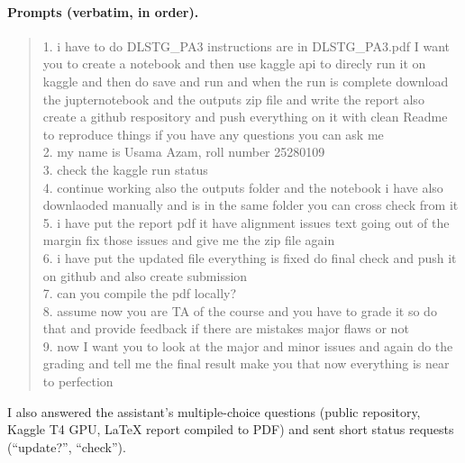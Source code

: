 \documentclass[11pt,a4paper]{article}
\begin{document}
\paragraph{Prompts (verbatim, in order).}
\begin{quote}\small\ttfamily\raggedright
1. i have to do DLSTG\_PA3 instructions are in DLSTG\_PA3.pdf I want you to create a notebook and then use kaggle api to direcly
run it on kaggle and then do save and run and when the run is complete download the jupternotebook and the outputs zip file and
write the report also create a github respository and push everything on it with clean Readme to reproduce things if you have
any questions you can ask me\\[2pt]
2. my name is Usama Azam, roll number 25280109\\[2pt]
3. check the kaggle run status\\[2pt]
4. continue working also the outputs folder and the notebook i have also downlaoded manually and is in the same folder you can
cross check from it\\[2pt]
5. i have put the report pdf it have alignment issues text going out of the margin fix those issues and give me the zip file again\\[2pt]
6. i have put the updated file everything is fixed do final check and push it on github and also create submission\\[2pt]
7. can you compile the pdf locally?\\[2pt]
8. assume now you are TA of the course and you have to grade it so do that and provide feedback if there are mistakes major
flaws or not\\[2pt]
9. now I want you to look at the major and minor issues and again do the grading and tell me the final result make you that now
everything is near to perfection
\end{quote}
I also answered the assistant's multiple-choice questions (public repository, Kaggle T4 GPU, LaTeX report compiled to PDF) and
sent short status requests (``update?'', ``check'').
\end{document}
